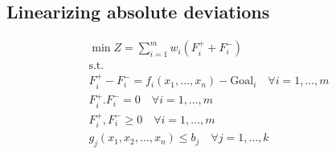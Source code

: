 \documentclass[10pt]{article}
\begin{document}
\subsection{Linearizing absolute deviations}
\begin{gather*}
    \min Z = \sum_{i = 1}^{m}w_i \left(F_i^{+} + F_i^-\right)\\
    \text{s.t.}\\
    F_i^{+} - F_i^- = f_i(x_1, \dots, x_n) - \text{Goal}_i\quad\forall i = 1,\dots, m \\
    F_i^{+} . F_i^- = 0\quad\forall i = 1, \dots, m\\
    F_i^{+} , F_i^- \ge 0\quad\forall i = 1, \dots, m\\
    g_j(x_1, x_2, \dots, x_n) \le b_j\quad\forall j = 1,\dots, k
\end{gather*}
\end{document}
